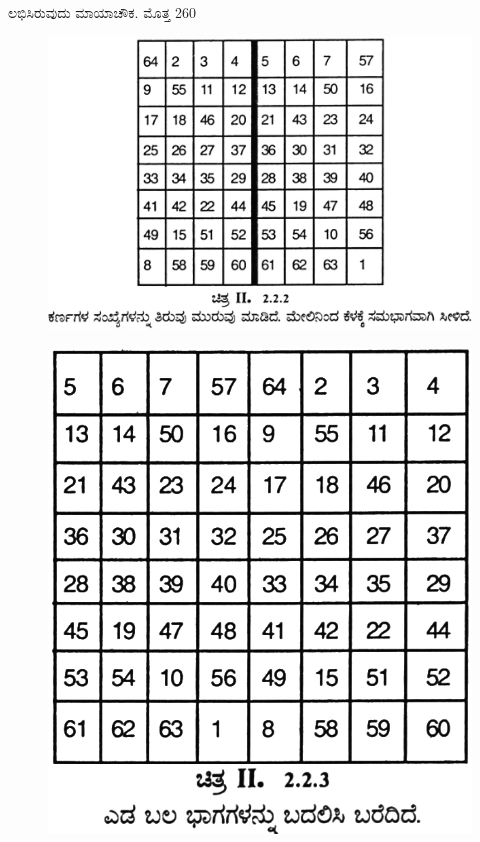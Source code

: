 \begin{itemize}
	ಲಭಿಸಿರುವುದು ಮಾಯಾಚೌಕ. ಮೊತ್ತ 260
	\begin{figure}[H]
	\includegraphics{src/figures/chap3/fig3-21.jpg}
	\end{figure}
	\begin{figure}[H]
	\includegraphics{src/figures/chap3/fig3-22.jpg}
	\end{figure}

\end{itemize}
